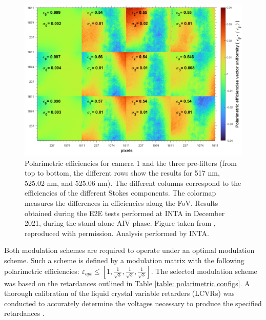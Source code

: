\begin{figure}[t]
    \includegraphics[width=\textwidth]{figures/TuMag/Pol_efficiencies_map.png}
    \caption[TuMag's polarimetric efficiencies.]{Polarimetric efficiencies for camera 1 and the three pre-filters (from top to bottom, the different rows show the results for 517 nm, 525.02 nm, and 525.06 nm). The different columns correspond to the efficiencies of the different Stokes components. The colormap measures the differences in efficiencies along the FoV. Results obtained during the E2E tests performed at INTA in December 2021, during the stand-alone AIV phase. Figure taken from \citep{tumag}, reproduced with permission. Analysis performed by INTA. \label{fig_tumag:pol eff maps}}
\end{figure}

Both modulation schemes are required to operate under an optimal modulation scheme. Such a scheme is defined by a modulation matrix with the following polarimetric efficiencies: $\varepsilon _{opt} \leq  [1, \frac{1}{\sqrt{3}}, \frac{1}{\sqrt{3}}, \frac{1}{\sqrt{3}}]$. The selected modulation scheme was based on the retardances outlined in Table \ref{table: polarimetric configs}. A thorough calibration of the liquid crystal variable retarders (LCVRs) was conducted to accurately determine the voltages necessary to produce the specified retardances \citep{fine-tunin}.

